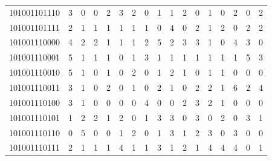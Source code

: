 \documentclass[10pt,a4paper]{article}
\begin{document}
\begin{longtable}{ |c|c|c|c|c|c|c|c|c|c|c|c|c|c|c|c|c| }
    101001101110              & 3                            & 0                                & 0                            & 2                              & 3   & 2   & 0   & 1   & 1   & 2   & 0   & 1   & 0   & 2   & 0   & 2   \\
    101001101111              & 2                            & 1                                & 1                            & 1                              & 1   & 1   & 1   & 0   & 4   & 0   & 2   & 1   & 2   & 0   & 2   & 2   \\
    101001110000              & 4                            & 2                                & 2                            & 1                              & 1   & 1   & 2   & 5   & 2   & 3   & 3   & 1   & 0   & 4   & 3   & 0   \\
    101001110001              & 5                            & 1                                & 1                            & 1                              & 0   & 1   & 3   & 1   & 1   & 1   & 1   & 1   & 1   & 1   & 5   & 3   \\
    101001110010              & 5                            & 1                                & 0                            & 1                              & 0   & 2   & 0   & 1   & 2   & 1   & 0   & 1   & 1   & 0   & 0   & 0   \\
    101001110011              & 3                            & 1                                & 0                            & 2                              & 0   & 1   & 0   & 2   & 1   & 0   & 2   & 2   & 1   & 6   & 2   & 4   \\
    101001110100              & 3                            & 1                                & 0                            & 0                              & 0   & 0   & 4   & 0   & 0   & 2   & 3   & 2   & 1   & 0   & 0   & 0   \\
    101001110101              & 1                            & 2                                & 2                            & 1                              & 2   & 0   & 1   & 3   & 3   & 0   & 3   & 0   & 2   & 0   & 3   & 1   \\
    101001110110              & 0                            & 5                                & 0                            & 0                              & 1   & 2   & 0   & 1   & 3   & 1   & 2   & 3   & 0   & 3   & 0   & 0   \\
    101001110111              & 2                            & 1                                & 1                            & 1                              & 4   & 1   & 1   & 3   & 1   & 2   & 1   & 4   & 4   & 4   & 0   & 1   \\

\end{longtable}
\end{document}
